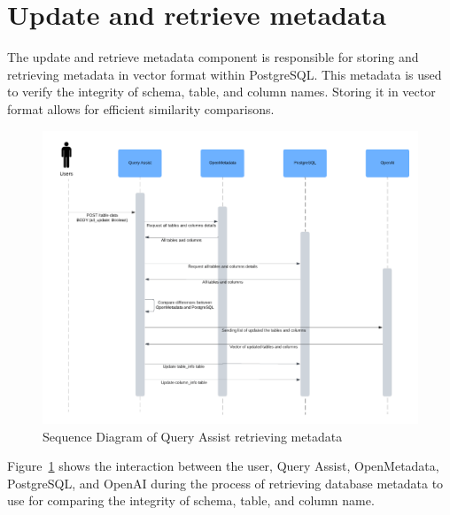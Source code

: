 \section{Update and retrieve metadata}
The update and retrieve metadata component is responsible for storing and retrieving metadata in vector format within PostgreSQL. This metadata is used to verify the integrity of schema, table, and column names. Storing it in vector format allows for efficient similarity comparisons.
\begin{figure}[H]
    \centering
    \includegraphics[width=15cm]{chapters/3/figures/retrieve_table.png}
    \caption[Sequence Diagram of Query Assist retrieving metadata]{Sequence Diagram of Query Assist retrieving metadata}
    \label{fig:retrieve_table_sequence_diagram}
\end{figure}
Figure~\ref{fig:retrieve_table_sequence_diagram} shows the interaction between the user, Query Assist, OpenMetadata, PostgreSQL, and OpenAI during the process of retrieving database metadata to use for comparing the integrity of schema, table, and column name. 

